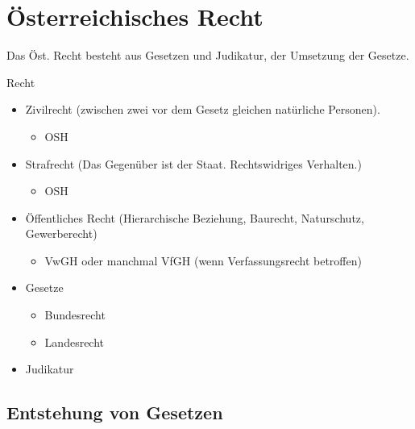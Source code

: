 \documentclass[12pt]{article}
\begin{document}
    \section{Österreichisches Recht}
    Das Öst. Recht besteht aus Gesetzen und Judikatur, der Umsetzung der Gesetze.

    Recht
    \begin{itemize}
        \item Zivilrecht (zwischen zwei vor dem Gesetz gleichen natürliche Personen).
        \begin{itemize}
            \item OSH
        \end{itemize}
        \item Strafrecht (Das Gegenüber ist der Staat. Rechtswidriges Verhalten.)
        \begin{itemize}
            \item OSH
        \end{itemize}
        \item Öffentliches Recht (Hierarchische Beziehung, Baurecht, Naturschutz, Gewerberecht)
        \begin{itemize}
            \item VwGH oder manchmal VfGH (wenn Verfassungsrecht betroffen) 
        \end{itemize}
    \end{itemize}

    \begin{itemize}
        \item Gesetze
        \begin{itemize}
            \item Bundesrecht
            \item Landesrecht
        \end{itemize}
        \item Judikatur
    \end{itemize}

    \subsection{Entstehung von Gesetzen}
\end{document}
